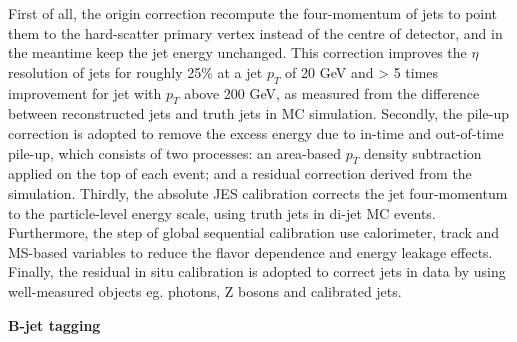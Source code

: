 First of all, the origin correction recompute the four-momentum of jets to point them to the hard-scatter primary vertex instead of the centre of detector, and in the meantime keep the jet energy unchanged.
This correction improves the $\eta$ resolution of jets for roughly 25\% at a jet $p_{T}$ of 20 GeV and > 5 times improvement for jet with $p_{T}$ above 200 GeV, 
as measured from the difference between reconstructed jets and truth jets in MC simulation.
Secondly, the pile-up correction is adopted to remove the excess energy due to in-time and out-of-time pile-up,
which consists of two processes: an area-based $p_{T}$ density subtraction applied on the top of each event; and a residual correction derived from the simulation.
Thirdly, the absolute JES calibration corrects the jet four-momentum to the particle-level energy scale, using truth jets in di-jet MC events.
Furthermore, the step of global sequential calibration use calorimeter, track and MS-based variables to reduce the flavor dependence and energy leakage effects.
Finally, the residual in situ calibration is adopted to correct jets in data by using well-measured objects eg. photons, Z bosons and calibrated jets.

\textbf{B-jet tagging}

